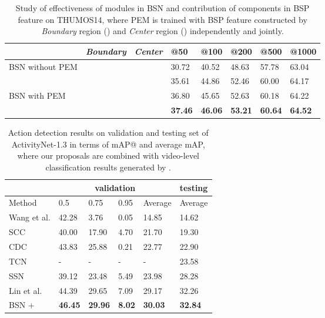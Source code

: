 \documentclass[runningheads]{llncs}
\begin{document}
\begin{table}[tbp]
\setlength{\abovecaptionskip}{0.1cm} \small
\centering
\caption{ Study of effectiveness of modules in BSN and  contribution of components in BSP feature on THUMOS14, where PEM is trained with BSP feature constructed by   \emph{Boundary} region () and   \emph{Center} region () independently and jointly.}
\begin{tabular}{p{2.7cm}p{1.3cm}<{\centering}p{1.3cm}<{\centering}p{1.2cm}<{\centering}p{1.2cm}<{\centering} p{1.2cm}<{\centering}p{1.2cm}<{\centering}p{1.2cm}<{\centering}}
\toprule
					& \emph{Boundary} 	& \emph{Center} 	& @50	& @100 	& @200	& @500	& @1000 \\
 \hline
 BSN without PEM 	&			&			& 30.72	& 40.52 	& 48.63	& 57.78	& 63.04\\
 \hline
 					&\Checkmark 	& 			& 35.61	& 44.86	& 52.46	& 60.00	& 64.17\\
 BSN with PEM 		&  			&\Checkmark	& 36.80	& 45.65	& 52.63	& 60.18	& 64.22\\
 					&\Checkmark	&\Checkmark	& {\bf 37.46}	& {\bf 46.06	}& {\bf 53.21}	& {\bf 60.64}	& {\bf 64.52}\\
\bottomrule
\end{tabular}
\label{table_post}
\vspace{-0.6cm}
\end{table}


\begin{table}[tbp]
\setlength{\abovecaptionskip}{0.1cm} \centering
\caption{Action detection results on validation and testing set of ActivityNet-1.3 in terms of mAP@ and average mAP, where our proposals are combined with video-level classification results generated by \cite{zhao2017cuhk}.  }
\small
\begin{tabular}{p{2.8cm}p{1.4cm}<{\centering}p{1.4cm}<{\centering}p{1.4cm}<{\centering}p{1.5cm}<{\centering}p{1.6cm}<{\centering}}
\toprule
& \multicolumn{4}{c}{validation} & testing  \\
\hline
Method  & 0.5  &  0.75  & 0.95  & Average  & Average  \\
\hline 
Wang et al. \cite{wang2016uts}    & 42.28 & 3.76  & 0.05   & 14.85 & 14.62 \\
SCC \cite{heilbron2017scc}   & 40.00 & 17.90  & 4.70   & 21.70 & 19.30 \\
CDC \cite{shou2017cdc}    & 43.83  & 25.88  & 0.21   & 22.77  & 22.90 \\
TCN \cite{dai2017temporal} & - & - & - & - & 23.58\\
SSN \cite{xiong2017pursuit}    & 39.12 & 23.48  & 5.49  & 23.98 & 28.28 \\
Lin et al. \cite{lin2017temporal} & 44.39   & 29.65  & 7.09  & 29.17 & 32.26 \\
\hline
BSN + \cite{zhao2017cuhk} & {\bf 46.45 }   & {\bf 29.96}  & {\bf 8.02}  & {\bf 30.03 } & {\bf 32.84 } \\
\bottomrule
\end{tabular}
\label{table_detection_anet}
\normalsize
\vspace{-0.1cm}                                                              
\end{table}
\end{document}
